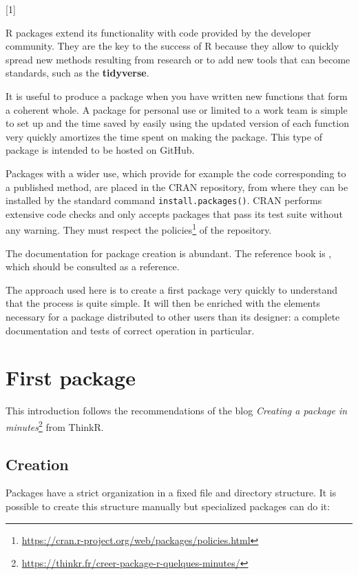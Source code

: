 \documentclass[
  12pt,
  american,
  a4paper,
  extrafontsizes,onecolumn,openright
  ]{memoir}
\newlength{\rf}
\newcommand{\toc}[1]{%
  \startcontents[chapters]%
  \printcontents[chapters]{}{1}[#1]{}%
  ~\newline%
}
\begin{document}
\toc{1}

R packages extend its functionality with code provided by the developer community.
They are the key to the success of R because they allow to quickly spread new methods resulting from research or to add new tools that can become standards, such as the \textbf{tidyverse}.

It is useful to produce a package when you have written new functions that form a coherent whole.
A package for personal use or limited to a work team is simple to set up and the time saved by easily using the updated version of each function very quickly amortizes the time spent on making the package.
This type of package is intended to be hosted on GitHub.

Packages with a wider use, which provide for example the code corresponding to a published method, are placed in the CRAN repository, from where they can be installed by the standard command \texttt{install.packages()}.
CRAN performs extensive code checks and only accepts packages that pass its test suite without any warning.
They must respect the policies\footnote{\url{https://cran.r-project.org/web/packages/policies.html}} of the repository.

The documentation for package creation is abundant.
The reference book is \textcite{Wickham2015}, which should be consulted as a reference.

The approach used here is to create a first package very quickly to understand that the process is quite simple.
It will then be enriched with the elements necessary for a package distributed to other users than its designer: a complete documentation and tests of correct operation in particular.

\section{First package}\label{first-package}

This introduction follows the recommendations of the blog \emph{Creating a package in minutes}\footnote{\url{https://thinkr.fr/creer-package-r-quelques-minutes/}} from ThinkR.

\subsection{Creation}\label{creation}

Packages have a strict organization in a fixed file and directory structure.
It is possible to create this structure manually but specialized packages can do it:
\end{document}
